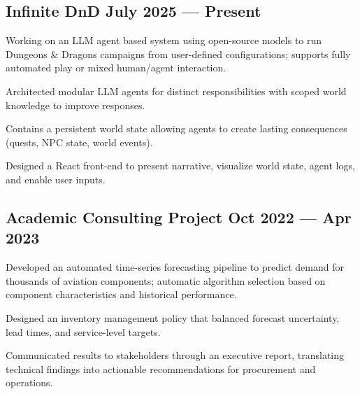 \subsection{{Infinite DnD \hfill July 2025 --- Present}}
\begin{zitemize}
    \setlength\itemsep{0.4em}
    \item Working on an LLM agent based system using open-source models to run Dungeons \& Dragons campaigns from user-defined configurations; supports fully automated play or mixed human/agent interaction.
    \item Architected modular LLM agents for distinct responsibilities with scoped world knowledge to improve responses.
    \item Contains a persistent world state allowing agents to create lasting consequences (quests, NPC state, world events).
    \item Designed a React front-end to present narrative, visualize world state, agent logs, and enable user inputs.
\end{zitemize}
\vspace{0.75em}

\subsection{{Academic Consulting Project \hfill Oct 2022 --- Apr 2023}}
\begin{zitemize}
    \setlength\itemsep{0.4em}
    \item Developed an automated time-series forecasting pipeline to predict demand for thousands of aviation components; automatic algorithm selection based on component characteristics and historical performance.
    \item Designed an inventory management policy that balanced forecast uncertainty, lead times, and service-level targets.
    \item Communicated results to stakeholders through an executive report, translating technical findings into actionable recommendations for procurement and operations.
\end{zitemize}
\vspace{0.75em}

